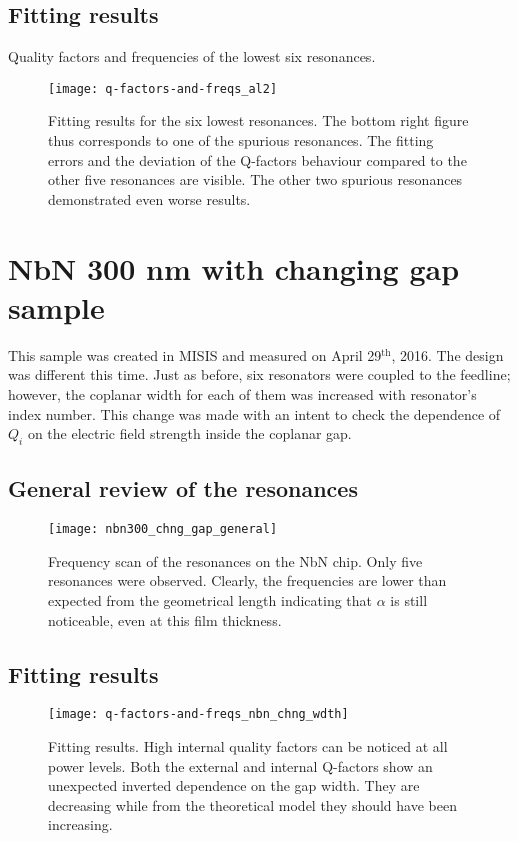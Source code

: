 \documentclass[12pt]{article}
\numberwithin{equation}{section}
\numberwithin{figure}{section}
\begin{document}
\subsection{Fitting results}

Quality factors and frequencies of the lowest six resonances.

\begin{figure}[h]
\centering
\texttt{[image: q-factors-and-freqs\_al2]}
\caption{Fitting results for the six lowest resonances. The bottom right figure thus corresponds to one of the spurious resonances. The fitting errors and the deviation of the Q-factors behaviour compared to the other five resonances are visible. The other two spurious resonances demonstrated even worse results.}
\end{figure}

\section{NbN 300 nm with changing gap sample}

This sample was created in MISIS and measured on April 29$^\text{th}$, 2016. The design was different this time. Just as before, six resonators were coupled to the feedline; however, the coplanar width for each of them was increased with resonator's index number. This change was made with an intent to check the dependence of $Q_i$ on the electric field strength inside the coplanar gap.


\subsection{General review of the resonances}

\begin{figure}[h!]
\centering
\texttt{[image: nbn300\_chng\_gap\_general]}
\caption{Frequency scan of the resonances on the NbN chip. Only five resonances were observed. Clearly, the frequencies are lower than expected from the geometrical length indicating that $\alpha$ is still noticeable, even at this film thickness.}
\end{figure}

\subsection{Fitting results}

\begin{figure}[h!]
\centering
\texttt{[image: q-factors-and-freqs\_nbn\_chng\_wdth]}
\caption{Fitting results. High internal quality factors can be noticed at all power levels. Both the external and internal Q-factors show an unexpected inverted dependence on the gap width. They are decreasing while from the theoretical model they should have been increasing.}
\end{figure}
\end{document}

